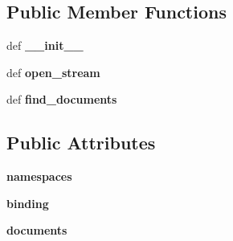\subsection*{Public Member Functions}
\begin{DoxyCompactItemize}
\item 
\hypertarget{classcheshire3_1_1web_1_1document_factory_1_1_srw_document_stream_a0b77de46a6e422470a56eb2535eb4d1f}{def {\bfseries \-\_\-\-\_\-init\-\_\-\-\_\-}}\label{classcheshire3_1_1web_1_1document_factory_1_1_srw_document_stream_a0b77de46a6e422470a56eb2535eb4d1f}

\item 
\hypertarget{classcheshire3_1_1web_1_1document_factory_1_1_srw_document_stream_ad766016f1b4975aaba99f2cd527c81ba}{def {\bfseries open\-\_\-stream}}\label{classcheshire3_1_1web_1_1document_factory_1_1_srw_document_stream_ad766016f1b4975aaba99f2cd527c81ba}

\item 
\hypertarget{classcheshire3_1_1web_1_1document_factory_1_1_srw_document_stream_a6c8b8a5af7295c3274cdf08613727261}{def {\bfseries find\-\_\-documents}}\label{classcheshire3_1_1web_1_1document_factory_1_1_srw_document_stream_a6c8b8a5af7295c3274cdf08613727261}

\end{DoxyCompactItemize}
\subsection*{Public Attributes}
\begin{DoxyCompactItemize}
\item 
\hypertarget{classcheshire3_1_1web_1_1document_factory_1_1_srw_document_stream_a061af02d6bc9f2f51ed496ab5293b9ac}{{\bfseries namespaces}}\label{classcheshire3_1_1web_1_1document_factory_1_1_srw_document_stream_a061af02d6bc9f2f51ed496ab5293b9ac}

\item 
\hypertarget{classcheshire3_1_1web_1_1document_factory_1_1_srw_document_stream_ac07d19a3267de77a379b133e9d6965c1}{{\bfseries binding}}\label{classcheshire3_1_1web_1_1document_factory_1_1_srw_document_stream_ac07d19a3267de77a379b133e9d6965c1}

\item 
\hypertarget{classcheshire3_1_1web_1_1document_factory_1_1_srw_document_stream_a6204b17341d277cdfa4477af1e8c7186}{{\bfseries documents}}\label{classcheshire3_1_1web_1_1document_factory_1_1_srw_document_stream_a6204b17341d277cdfa4477af1e8c7186}

\end{DoxyCompactItemize}

